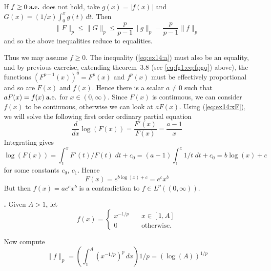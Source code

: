 \begin{enumerate}
If \(f\geq0\;\textrm{a.e.}\) does not hold, take
\(g(x)=|f(x)|\) and \(G(x)=(1/x)\int_0^x g(t)\,dt\).
Then
\begin{equation*}
\|F\|_p\leq \|G\|_p \leq \frac{p}{p-1}\|g\|_p = \frac{p}{p-1}\|f\|_p
\end{equation*}
and so the above inequalities reduce to equalities.

Thus we may assume \(f\geq0\). The inequality (\ref{eq:ex14:a})
must also be an equality, and by previous exercise, extending theorem~3.8
\cite{RudinRCA80} (see \ref{eq:fg1:eq:fpgq}) above),
the functions \((F^{p-1}(x))^q = F^p(x)\) and \(f^p(x)\) must be
effectively proportional and so are \(F(x)\) and \(f(x)\).
Hence there is a scalar \(a\neq 0\) such that
\(aF(x) = f(x)\;\textrm{a.e.}\) for \(x\in(0,\infty)\).
Since \(F(x)\) is continuous, we can consider \(f(x)\) to be continuous,
otherwise we can look at \(aF(x)\). Using (\ref{eq:ex14:xF}),
we will solve the following first order ordinary partial equation
\begin{equation*}
\frac{d}{dx} \log(F(x)) = \frac{F'(x)}{F(x)} = \frac{a-1}{x}
\end{equation*}
Integrating gives
\begin{equation*}
 \log(F(x)) = \int_1^x F'(t)/F(t)\;dt + c_0 = (a-1)\int_1^x 1/t\;dt + c_0
 = b\log(x) + c
\end{equation*}
for some constants \(c_0\), \(c_1\).
Hence
\begin{equation*}
F(x) = e^{b\log(x)+c} = e^c x^b
\end{equation*}
But then \(f(x) = ae^c x^b\) is a contradiction to \(f \in L^p((0,\infty))\).

\textbf{.}
Given \(A>1\), let
\begin{equation*}
f(x) = \left\{ \begin{array}{ll}
                 x^{-1/p}   & \quad  x\in[1,A] \\
                 0         & \quad  \textrm{otherwise}.
                \end{array}\right.
\end{equation*}

Now compute
\begin{equation*}
\|f\|_p = \left(\int_1^A (x^{-1/p})^p\,dx\right){1/p}
        = \left(\log(A)\right)^{1/p}
\end{equation*}


\end{enumerate}
